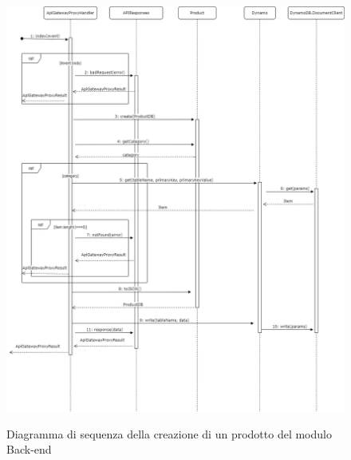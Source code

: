 \begin{figure}[H]
\centering
\includegraphics[scale=0.40]{res/Architettura/Backend/img/diagrammaSequenzaCreazioneProdotto.png}\\
\caption{Diagramma di sequenza della creazione di un prodotto del modulo Back-end}
\label{fig:createProduct}
\end{figure}